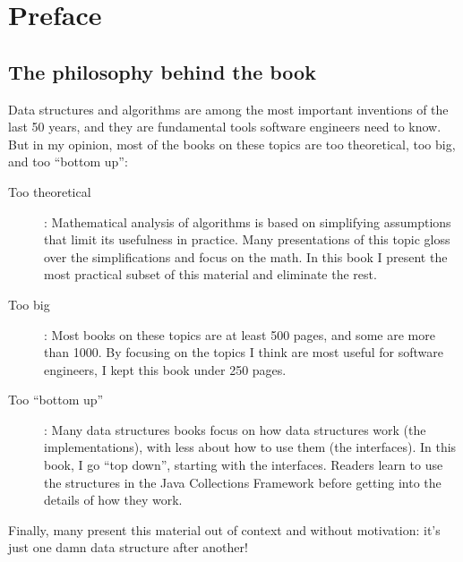 \documentclass[12pt]{book}
\theoremstyle{exercise}
\begin{document}

\fi


\chapter*{Preface}
\label{preface}



\section*{The philosophy behind the book}

Data structures and algorithms are among the most important inventions
of the last 50 years, and they are fundamental tools
software engineers need to know.  But in my opinion, most of the books
on these topics are too theoretical, too big, and too ``bottom up'':

\begin{description}

\item[Too theoretical]:  Mathematical analysis of algorithms is based
on simplifying assumptions that limit its usefulness in practice.
Many presentations of this topic gloss over the simplifications and
focus on the math.  In this book I present the most practical subset
of this material and eliminate the rest.

\item[Too big]: Most books on these topics are at least 500 pages,
and some are more than 1000.  By focusing on the topics I think are
most useful for software engineers, I kept this book under
250 pages.


\item[Too ``bottom up'']: Many data structures books focus on how data
  structures work (the implementations), with less about how to use
  them (the interfaces).  In this book, I go ``top down'', starting
  with the interfaces.  Readers learn to use the structures in the
  Java Collections Framework before getting into the details of how
  they work.

\end{description}

Finally, many present this material out of context and without
motivation: it's just one damn data structure after another!
\end{document}
